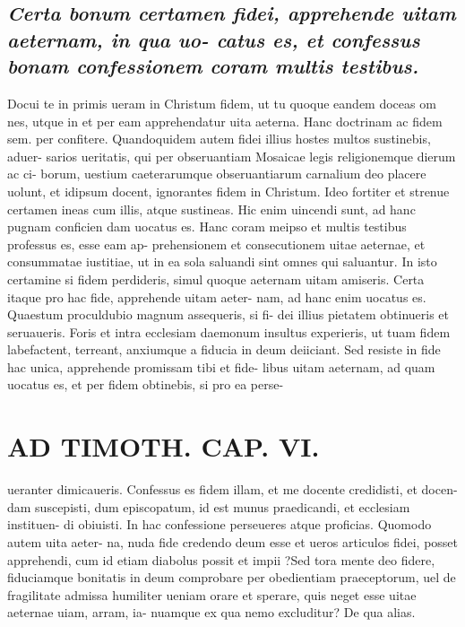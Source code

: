 \documentclass{article}
\begin{document}
\begin{pages}
\subsection*{\textit{Certa bonum certamen fidei, apprehende uitam aeternam, in qua uo- catus es, et confessus bonam confessionem coram multis testibus. }}\pstart Docui te in primis ueram in Christum fidem, ut tu quoque eandem doceas om nes, utque in et per eam apprehendatur uita aeterna. Hanc doctrinam ac fidem sem. per confitere. Quandoquidem autem fidei illius hostes multos sustinebis, aduer- sarios ueritatis, qui per obseruantiam Mosaicae legis religionemque dierum ac ci- borum, uestium caeterarumque obseruantiarum carnalium deo placere uolunt, et idipsum docent, ignorantes fidem in Christum. Ideo fortiter et strenue certamen ineas cum illis, atque sustineas. Hic enim uincendi sunt, ad hanc pugnam conficien dam uocatus es. Hanc coram meipso et multis testibus professus es, esse eam ap- prehensionem et consecutionem uitae aeternae, et consummatae iustitiae, ut in ea sola saluandi sint omnes qui saluantur. In isto certamine si fidem perdideris, simul quoque aeternam uitam amiseris. Certa itaque pro hac fide, apprehende uitam aeter- nam, ad hanc enim uocatus es. Quaestum proculdubio magnum assequeris, si fi- dei illius pietatem obtinueris et seruaueris. Foris et intra ecclesiam daemonum insultus experieris, ut tuam fidem labefactent, terreant, anxiumque a fiducia in deum deiiciant. Sed resiste in fide hac unica, apprehende promissam tibi et fide- libus uitam aeternam, ad quam uocatus es, et per fidem obtinebis, si pro ea perse-  \pend
\section*{AD TIMOTH. CAP. VI. }
\marginpar{[ p.537 ]}\pstart ueranter dimicaueris. Confessus es fidem illam, et me docente credidisti, et docen- dam suscepisti, dum episcopatum, id est munus praedicandi, et ecclesiam instituen- di obiuisti. In hac confessione perseueres atque proficias. Quomodo autem uita aeter- na, nuda fide credendo deum esse et ueros articulos fidei, posset apprehendi, cum id etiam diabolus possit et impii ?Sed tora mente deo fidere, fiduciamque bonitatis in deum comprobare per obedientiam praeceptorum, uel de fragilitate admissa humiliter ueniam orare et sperare, quis neget esse uitae aeternae uiam, arram, ia- nuamque ex qua nemo excluditur? De qua alias.  \pend
{}
{}

\end{pages}
\end{document}
